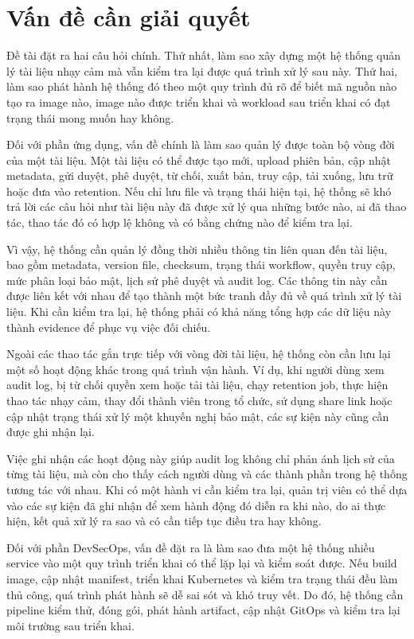 \section{Vấn đề cần giải quyết}

Đề tài đặt ra hai câu hỏi chính. Thứ nhất, làm sao xây dựng một hệ thống quản lý tài liệu nhạy cảm mà vẫn kiểm tra lại được quá trình xử lý sau này. Thứ hai, làm sao phát hành hệ thống đó theo một quy trình đủ rõ để biết mã nguồn nào tạo ra image nào, image nào được triển khai và workload sau triển khai có đạt trạng thái mong muốn hay không.

Đối với phần ứng dụng, vấn đề chính là làm sao quản lý được toàn bộ vòng đời của một tài liệu. Một tài liệu có thể được tạo mới, upload phiên bản, cập nhật metadata, gửi duyệt, phê duyệt, từ chối, xuất bản, truy cập, tải xuống, lưu trữ hoặc đưa vào retention. Nếu chỉ lưu file và trạng thái hiện tại, hệ thống sẽ khó trả lời các câu hỏi như tài liệu này đã được xử lý qua những bước nào, ai đã thao tác, thao tác đó có hợp lệ không và có bằng chứng nào để kiểm tra lại.

Vì vậy, hệ thống cần quản lý đồng thời nhiều thông tin liên quan đến tài liệu, bao gồm metadata, version file, checksum, trạng thái workflow, quyền truy cập, mức phân loại bảo mật, lịch sử phê duyệt và audit log. Các thông tin này cần được liên kết với nhau để tạo thành một bức tranh đầy đủ về quá trình xử lý tài liệu. Khi cần kiểm tra lại, hệ thống phải có khả năng tổng hợp các dữ liệu này thành evidence để phục vụ việc đối chiếu.

Ngoài các thao tác gắn trực tiếp với vòng đời tài liệu, hệ thống còn cần lưu lại một số hoạt động khác trong quá trình vận hành. Ví dụ, khi người dùng xem audit log, bị từ chối quyền xem hoặc tải tài liệu, chạy retention job, thực hiện thao tác nhạy cảm, thay đổi thành viên trong tổ chức, sử dụng share link hoặc cập nhật trạng thái xử lý một khuyến nghị bảo mật, các sự kiện này cũng cần được ghi nhận lại.

Việc ghi nhận các hoạt động này giúp audit log không chỉ phản ánh lịch sử của từng tài liệu, mà còn cho thấy cách người dùng và các thành phần trong hệ thống tương tác với nhau. Khi có một hành vi cần kiểm tra lại, quản trị viên có thể dựa vào các sự kiện đã ghi nhận để xem hành động đó diễn ra khi nào, do ai thực hiện, kết quả xử lý ra sao và có cần tiếp tục điều tra hay không.

Đối với phần DevSecOps, vấn đề đặt ra là làm sao đưa một hệ thống nhiều service vào một quy trình triển khai có thể lặp lại và kiểm soát được. Nếu build image, cập nhật manifest, triển khai Kubernetes và kiểm tra trạng thái đều làm thủ công, quá trình phát hành sẽ dễ sai sót và khó truy vết. Do đó, hệ thống cần pipeline kiểm thử, đóng gói, phát hành artifact, cập nhật GitOps và kiểm tra lại môi trường sau triển khai.

